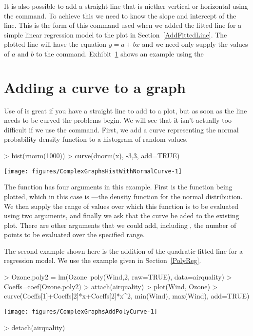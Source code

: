 It is also possible to add a straight line that is niether vertical or horizontal using the  command. To achieve this we need to know the slope and intercept of the line. This is the form of this command used when we added the fitted line for a simple linear regression model to the plot in Section~\ref{AddFittedLine}. The plotted line will have the equation $y=a+bx$ and we need only supply the values of $a$ and $b$ to the  command. Exhibit~\ref{} shows an example using the  
 
\section{Adding a curve to a graph} 
 
Use of  is great if you have a straight line to add to a plot, but as soon as the line needs to be curved the problems begin. We will see that it isn't actually too difficult if we use the  command. First, we add a curve representing the normal probability density function to a histogram of random values. 
\begin{Schunk}
\begin{Sinput}
> hist(rnorm(1000)) 
> curve(dnorm(x), -3,3, add=TRUE) 
\end{Sinput}

\texttt{[image: figures/ComplexGraphsHistWithNormalCurve-1]} \end{Schunk}
 
The  function has four arguments in this example. First is the function being plotted, which in this case is  ---the density function for the normal distribution. We then supply the range of values over which this function is to be evaluated using two arguments, and finally we ask that the curve be aded to the existing plot. There are other arguments that we could add, including , the number of points to be evaluated over the specified range. 
 
The second example shown here is the addition of the quadratic fitted line for a regression model. We use the example given in Section~\ref{PolyReg}. 
\begin{Schunk}
\begin{Sinput}
> Ozone.poly2 = lm(Ozone~poly(Wind,2, raw=TRUE), data=airquality) 
> Coeffs=coef(Ozone.poly2) 
> attach(airquality) 
> plot(Wind, Ozone) 
> curve(Coeffs[1]+Coeffs[2]*x+Coeffs[2]*x^2, min(Wind), max(Wind), add=TRUE) 
\end{Sinput}

\texttt{[image: figures/ComplexGraphsAddPolyCurve-1]} \begin{Sinput}
> detach(airquality) 
\end{Sinput}
\end{Schunk}
 
